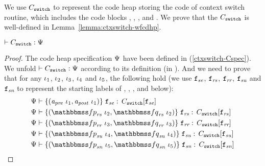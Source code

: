 We use $C_{\texttt{switch}}$ to represent the
code heap storing the code of context switch routine,
which includes the code blocks \SwitchEntry{},
\regsave{}, \regrestore{},
\SaveUsedWin{} and \SwitchNewTask{}. We prove that
the $C_{\texttt{switch}}$ is well-defined in
Lemma~\ref{lemma:ctxswitch-wfcdhp}.

\begin{lemma}
    \em
    \label{lemma:ctxswitch-wfcdhp}
    $\vdash {C_{\texttt{switch}}} : {\Psi{}}$
\end{lemma}
\begin{proof}
    The code heap specification $\Psi{}$ have been
    defined in (\ref{ctxswitch-Cspec}). We unfold
    $\vdash {C_{\texttt{switch}}} : {\Psi{}}$
    according to its definition
    (in \Fig{\ref{fig:Selected Inference Rules for Refinement Verification}}).
    And we need to prove that for any $\iota_1$,
    $\iota_2$, $\iota_3$,
    $\iota_4$ and $\iota_5$, the following hold
    (we use $\texttt{f}_{\textit{se}}$, $\texttt{f}_{\textit{rs}}$,
    $\texttt{f}_{\textit{rr}}$, $\texttt{f}_{\textit{su}}$ and
    $\texttt{f}_{\textit{sn}}$ to represent the starting labels of
    \SwitchEntry{}, \regsave{}, \regrestore{},
    \SaveUsedWin{} and \SwitchNewTask{} below):
    \begin{align}
        & \wfcblk{\Apre \ \lgvl_1}{\Apost \ \lgvl_1}
            {\lab{\textit{se}}}
            {\code_{\texttt{switch}}
            [\lab{\textit{se}}]}
            \label{ctxswitch-wfse} \\
        & \wfcblk{\relspecpre_{\textit{rs}} \ \lgvl_2}
            {\relspecpost_{\textit{rs}} \ \lgvl_2}
            {\lab{\textit{rs}}}
            {\code_{\texttt{switch}}
            [\lab{\textit{rs}}]}
            \label{ctxswitch-wfrs} \\
        & \wfcblk{\relspecpre_{\textit{rr}} \ \lgvl_3}
            {\relspecpost_{\textit{rr}}\ \lgvl_3}
            {\lab{\textit{rr}}}
            {\code_{\texttt{switch}}
            [\lab{\textit{rr}}]}
            \label{ctxswitch-wfrr} \\
        & \wfcblk{\relspecpre_{\textit{su}} \ \lgvl_4}
            {\relspecpost_{\textit{su}} \ \lgvl_4}
            {\lab{\textit{su}}}
            {\code_{\texttt{switch}}[\lab{\textit{su}}]}
            \label{ctxswitch-wfsu} \\
        & \wfcblk{\relspecpre_{\textit{sn}} \ \lgvl_5}
            {\relspecpost_{\textit{sn}} \ \lgvl_5}
            {\lab{\textit{sn}}}
            {\code_{\texttt{switch}}[\lab{\textit{sn}}]}
            \label{ctxswitch-wfsn}
    \end{align}


\end{proof}

